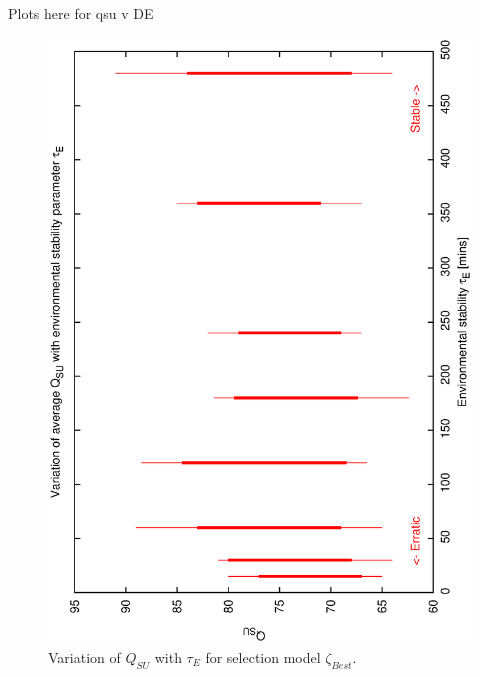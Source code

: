 Plots here for qsu v DE

\begin{figure}[h]

\begin{center}
 \includegraphics[scale=0.5, angle=-90]{figures/best_de.eps}
 \caption[Variation of $Q_{SU}$ with $\tau_E$ for selection model $\zeta_{Best}$.] 
   {Variation of $Q_{SU}$ with $\tau_E$ for selection model $\zeta_{Best}$.}
\label{fig:qsu_de_best}
\end{center} 
\end{figure}

